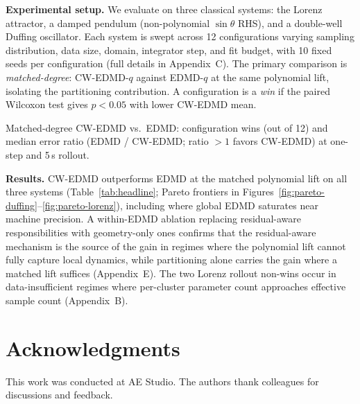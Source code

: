 \documentclass{article}
\begin{document}
\begin{multicols}{2}
\textbf{Experimental setup.} We evaluate on three classical systems: the Lorenz attractor,
a damped pendulum (non-polynomial $\sin\theta$ RHS), and a double-well Duffing oscillator.
Each system is swept across 12 configurations varying sampling distribution, data size,
domain, integrator step, and fit budget, with 10 fixed seeds per configuration (full
details in Appendix~C). The primary comparison is \emph{matched-degree}: CW-EDMD-$q$
against EDMD-$q$ at the same polynomial lift, isolating the partitioning contribution.
A configuration is a \emph{win} if the paired Wilcoxon test gives $p < 0.05$ with lower
CW-EDMD mean.

\begin{table}[H]
\caption{Matched-degree CW-EDMD vs.\ EDMD: configuration wins (out of 12) and median error ratio
(EDMD / CW-EDMD; ratio $>1$ favors CW-EDMD) at one-step and 5\,s rollout.}
\label{tab:headline}
\centering\footnotesize
\setlength{\tabcolsep}{3pt}

\end{table}

\noindent\textbf{Results.} CW-EDMD outperforms EDMD at the matched polynomial lift on all
three systems (Table~\ref{tab:headline}; Pareto frontiers in
Figures~\ref{fig:pareto-duffing}--\ref{fig:pareto-lorenz}), including where global EDMD
saturates near machine precision. A
within-EDMD ablation replacing residual-aware responsibilities with geometry-only ones
confirms that the residual-aware mechanism is the source of the gain in regimes where the
polynomial lift cannot fully capture local dynamics, while partitioning alone carries the
gain where a matched lift suffices (Appendix~E). The two Lorenz rollout
non-wins occur in data-insufficient regimes where per-cluster parameter count approaches
effective sample count (Appendix~B).


\section*{Acknowledgments}
This work was conducted at AE Studio. The authors thank colleagues for discussions and feedback.





\end{multicols}

\raggedbottom
\end{document}
